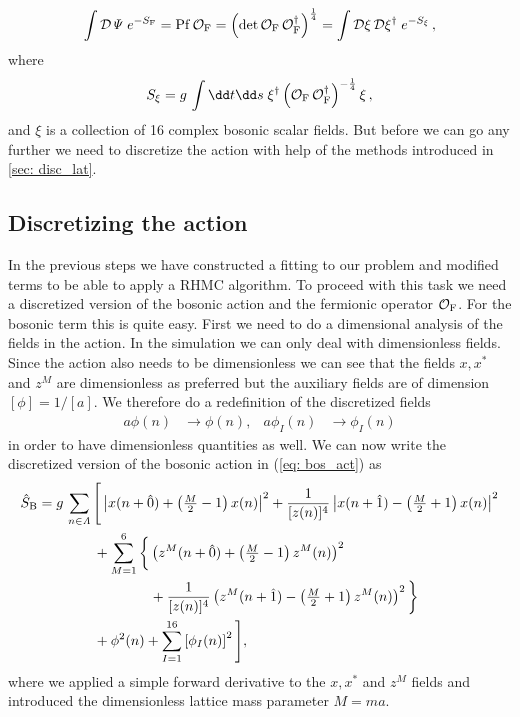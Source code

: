 %
%
\begin{equation}
\int \mathcal{D}\mathit{\Psi}\; e^{-S_{\rm F}} = {\rm Pf}\,\mathcal{O}_{\rm F} =\left( \det \mathcal{O}_{\rm F}\,\mathcal{O}_{\rm F}^{\dagger} \right)^{\frac{1}{4}} = \int \mathcal{D}\xi\,\mathcal{D}\xi^{\dagger}\; e^{-S_{\xi}}\,,
\end{equation}
%
%
where
%
%
\begin{equation}
S_{\xi} = g\,\int \dd t\dd s \; \xi^{\dagger} \left(\mathcal{O}_{\rm F}\,\mathcal{O}_{\rm F}^{\dagger} \right)^{-\frac{1}{4}} \xi \,,
\end{equation}
and $\xi$ is a collection of 16 complex bosonic scalar fields. But before we can go any further we need to discretize the action with help of the methods introduced in \autoref{sec: disc_lat}. 
%
%
%
%
%
%
%
%
%
%
\subsection{Discretizing the action}
In the previous steps we have constructed a  fitting to our problem and modified terms to be able to apply a RHMC algorithm. To proceed with this task we need a discretized version of the bosonic action and the fermionic operator $\mathcal{O}_{\rm F}$. For the bosonic term this is quite easy. First we need to do a dimensional analysis of the fields in the action. In the simulation we can only deal with dimensionless fields. Since the action also needs to be dimensionless we can see that the fields $x,x^{*}$ and $z^{M}$ are dimensionless as preferred but the auxiliary fields are of dimension $[\phi]=1/[a]$. We therefore do a redefinition of the discretized fields
%
%
\begin{align}
a\phi(n) &\to \phi(n), & a\phi_{I}(n) &\to \phi_{I}(n)
\end{align}
%
%
in order to have dimensionless quantities as well. We can now write the discretized version of the bosonic action in (\ref{eq: bos_act}) as
%
%
\begin{align}
\hat{S}_{\rm B} &= g\, \sum\limits_{n\in\mathit{\Lambda}} \Bigg[ \left\vert x(n+\hat{0}) + \left(\tfrac{M}{2}-1\right) x(n) \right\vert^{2} 
+ \frac{1}{[z(n)]^{4}} \left\vert x(n+\hat{1}) - \left(\tfrac{M}{2}+1\right) x(n) \right\vert^{2} \notag\\
%
%
&\qquad\qquad + \sum\limits_{M=1}^{6} \bigg\lbrace \left(z^{M}(n+\hat{0}) + \left(\tfrac{M}{2} -1\right)z^{M}(n) \right)^{2} \\
%
%
&\qquad\qquad\qquad\qquad + \frac{1}{[z(n)]^{4}} \left( z^{M}(n+\hat{1}) -\left(\tfrac{M}{2}+1\right) z^{M}(n) \right)^{2} \bigg\rbrace \notag \\
&\qquad\qquad +\phi^{2}(n) + \sum\limits_{I=1}^{16}\left[\phi_{I}(n)\right]^{2} \Bigg], \notag
\end{align}
%
%
where we applied a simple forward derivative to the $x,x^{*}$ and $z^{M}$ fields and introduced the dimensionless lattice mass parameter $M=ma$.